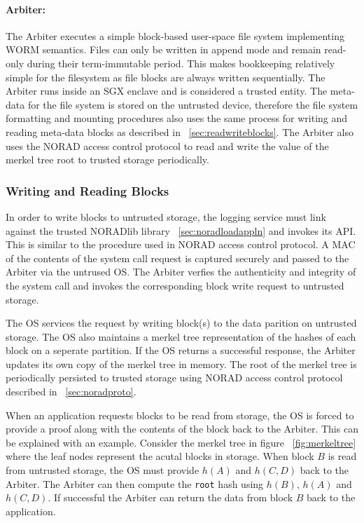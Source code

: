 \documentclass[withindex,glossary]{cam-thesis}
\begin{document}
\paragraph{Arbiter:}
The Arbiter executes a simple block-based user-space file system implementing WORM semantics.
Files can only be written in append mode and remain read-only during their term-immutable period.
This makes bookkeeping relatively simple for the filesystem as file blocks are always written sequentially.
The Arbiter runs inside an SGX enclave and is considered a trusted entity.
The meta-data for the file system is stored on the untrusted device, therefore the file system formatting and mounting procedures also uses the same process for writing and reading meta-data blocks as described in ~\ref{sec:readwriteblocks}.
The Arbiter also uses the NORAD access control protocol to read and write the value of the merkel tree root to trusted storage periodically.

\subsubsection{Writing and Reading Blocks}
In order to write blocks to untrusted storage, the logging service must link against the trusted NORADlib library ~\ref{sec:noradloadappln} and invokes its API.
This is similar to the procedure used in NORAD access control protocol.
A MAC of the contents of the system call request is captured securely and passed to the Arbiter via the untrused OS.
The Arbiter verfies the authenticity and integrity of the system call and invokes the corresponding block write request to untrusted storage.

The OS services the request by writing block(s) to the data parition on untrusted storage.
The OS also maintains a merkel tree representation of the hashes of each block on a seperate partition.
If the OS returns a successful response, the Arbiter updates its own copy of the merkel tree in memory.
The root of the merkel tree is periodically persisted to trusted storage using NORAD access control protocol described in ~\ref{sec:noradproto}.

When an application requests blocks to be read from storage, the OS is forced to provide a proof along with the contents of the block back to the Arbiter.
This can be explained with an example.
Consider the merkel tree in figure ~\ref{fig:merkeltree} where the leaf nodes represent the acutal blocks in storage.
When block $B$ is read from untrusted storage, the OS must provide $h(A)$ and $h(C,D)$ back to the Arbiter.
The Arbiter can then compute the \texttt{root} hash using $h(B)$, $h(A)$ and $h(C,D)$.
If successful the Arbiter can return the data from block $B$ back to the application.
\end{document}
